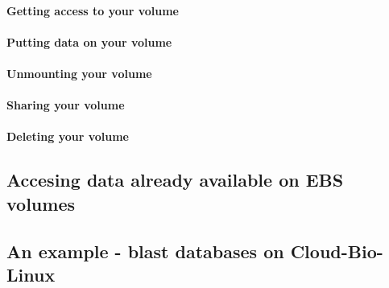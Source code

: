 \paragraph{Getting access to  your volume}

\paragraph{Putting data on your volume}

\paragraph{Unmounting your volume}

\paragraph{Sharing your volume}

\paragraph{Deleting your volume}


\subsection{Accesing data already available on EBS volumes}

\subsection{An example - blast databases on Cloud-Bio-Linux}



